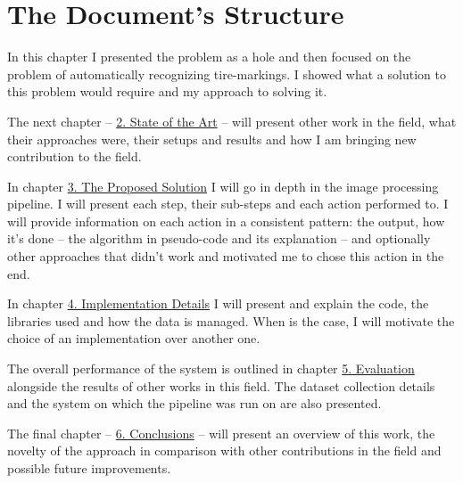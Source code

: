 \section{The Document's Structure}

In this chapter I presented the problem as a hole and then focused on the problem of automatically recognizing tire-markings. I showed what a solution to this problem would require and my approach to solving it.

The next chapter -- \hyperref[chap:state-of-the-art]{2. State of the Art} -- will present other work in the field, what their approaches were, their setups and results and how I am bringing new contribution to the field.

In chapter \hyperref[chap:proposed-solution]{3. The Proposed Solution} I will go in depth in the image processing pipeline. I will present each step, their sub-steps and each action performed to. I will provide information on each action in a consistent pattern: the output, how it's done -- the algorithm in pseudo-code and its explanation -- and optionally other approaches that didn't work and motivated me to chose this action in the end.

In chapter \hyperref[chap:implementation-details]{4. Implementation Details} I will present and explain the code, the libraries used and how the data is managed. When is the case, I will motivate the choice of an implementation over another one.

The overall performance of the system is outlined in chapter \hyperref[chap:evaluation]{5. Evaluation} alongside the results of other works in this field. The dataset collection details and the system on which the pipeline was run on are also presented.

The final chapter -- \hyperref[chap:conclusions]{6. Conclusions} -- will present an overview of this work, the novelty of the approach in comparison with other contributions in the field and possible future improvements.
